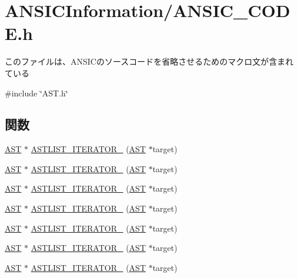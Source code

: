 \section{ANSICInformation/ANSIC\_\-CODE.h}
\label{ANSIC__CODE_8h}


このファイルは、ANSICのソースコードを省略させるためのマクロ文が含まれている  


{\ttfamily \#include \char`\"{}AST.h\char`\"{}}\par
\subsection*{関数}
\begin{DoxyCompactItemize}
\item 
\hyperlink{structabstract__syntax__tree}{AST} $\ast$ \hyperlink{ANSIC__CODE_8h_afd59f7ad772c4c0d860af27c6022ddc4}{ASTLIST\_\-ITERATOR\_} (\hyperlink{structabstract__syntax__tree}{AST} $\ast$target)
\item 
\hyperlink{structabstract__syntax__tree}{AST} $\ast$ \hyperlink{ANSIC__CODE_8h_a73903c600b2da1a0a5688cb24d51b5c8}{ASTLIST\_\-ITERATOR\_} (\hyperlink{structabstract__syntax__tree}{AST} $\ast$target)
\item 
\hyperlink{structabstract__syntax__tree}{AST} $\ast$ \hyperlink{ANSIC__CODE_8h_a3ee8c07d54acacf05159110df98d20bb}{ASTLIST\_\-ITERATOR\_} (\hyperlink{structabstract__syntax__tree}{AST} $\ast$target)
\item 
\hyperlink{structabstract__syntax__tree}{AST} $\ast$ \hyperlink{ANSIC__CODE_8h_ada046dab857af620b236cdef081afded}{ASTLIST\_\-ITERATOR\_} (\hyperlink{structabstract__syntax__tree}{AST} $\ast$target)
\item 
\hyperlink{structabstract__syntax__tree}{AST} $\ast$ \hyperlink{ANSIC__CODE_8h_a24a75676c4d42fe258710f36e4a3e0cb}{ASTLIST\_\-ITERATOR\_} (\hyperlink{structabstract__syntax__tree}{AST} $\ast$target)
\item 
\hyperlink{structabstract__syntax__tree}{AST} $\ast$ \hyperlink{ANSIC__CODE_8h_afe4b80ce43405958fd5c819aea9ab84a}{ASTLIST\_\-ITERATOR\_} (\hyperlink{structabstract__syntax__tree}{AST} $\ast$target)
\item 
\hyperlink{structabstract__syntax__tree}{AST} $\ast$ \hyperlink{ANSIC__CODE_8h_a66de9e6665fdb8c1325018de108ab844}{ASTLIST\_\-ITERATOR\_} (\hyperlink{structabstract__syntax__tree}{AST} $\ast$target)
\end{DoxyCompactItemize}


